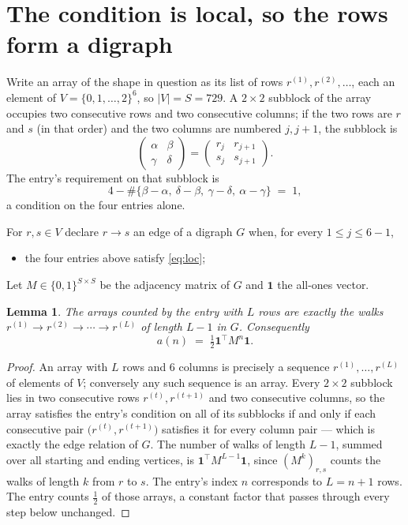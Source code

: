 \documentclass[11pt,a4paper]{article}
\theoremstyle{plain}
\newtheorem{lemma}[theorem]{Lemma}
\theoremstyle{definition}
\begin{document}
\section{The condition is local, so the rows form a digraph}

Write an array of the shape in question as its list of rows
$r^{(1)},r^{(2)},\dots$, each an element of
$V=\{0,1,\dots,2\}^{6}$, so $|V|=S=729$. A $2\times2$ subblock of the array
occupies two consecutive rows and two consecutive columns; if the two rows are $r$
and $s$ (in that order) and the two columns are numbered $j,j+1$,
the subblock is
\[
\begin{pmatrix}\alpha&\beta\\\gamma&\delta\end{pmatrix}=\begin{pmatrix}r_j&r_{j+1}\\s_j&s_{j+1}\end{pmatrix}.
\]
The entry's requirement on that subblock is
\begin{equation}\label{eq:loc}
4-\#\{\beta-\alpha,\ \delta-\beta,\ \gamma-\delta,\ \alpha-\gamma\}\;=\;1,
\end{equation}
a condition on the four entries alone.

For $r,s\in V$ declare $r\to s$ an edge of a digraph $G$ when, for every
$1\le j\le 6-1$,
\begin{itemize}
\item the four entries above satisfy \eqref{eq:loc};

\end{itemize}
Let $M\in\{0,1\}^{S\times S}$ be the adjacency matrix of $G$ and $\mathbf{1}$ the
all-ones vector.

\begin{lemma}\label{lem:walk}
The arrays counted by the entry with $L$ rows are exactly the walks
$r^{(1)}\to r^{(2)}\to\cdots\to r^{(L)}$ of length $L-1$ in $G$. Consequently
\[
a(n)\;=\;\tfrac1{2}\mathbf{1}^{\!\top}M^{n}\mathbf{1} .
\]
\end{lemma}

\begin{proof}
An array with $L$ rows and $6$ columns is precisely a sequence
$r^{(1)},\dots,r^{(L)}$ of elements of $V$; conversely any such sequence is an array.
Every $2\times2$ subblock lies in two consecutive rows $r^{(t)},r^{(t+1)}$ and two
consecutive columns, so the array satisfies the entry's condition on all of its subblocks
if and only if each consecutive pair $\bigl(r^{(t)},r^{(t+1)}\bigr)$ satisfies it for
every column pair --- which is exactly the edge relation of $G$. The number of walks of
length $L-1$, summed over all starting and ending vertices, is
$\mathbf{1}^{\!\top}M^{L-1}\mathbf{1}$, since $(M^{k})_{r,s}$ counts the walks of
length $k$ from $r$ to $s$. The entry's index $n$ corresponds to $L=n+1$ rows. The entry counts $\tfrac1{2}$ of those arrays, a constant factor that passes through every step below unchanged.
\end{proof}
\end{document}
